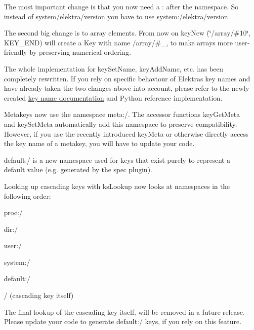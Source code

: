 \begin{DoxyItemize}
\item The most important change is that you now need a {\ttfamily \+:} after the namespace. So instead of {\ttfamily system/elektra/version} you have to use {\ttfamily system\+:/elektra/version}.
\item The second big change is to array elements. From now on {\ttfamily key\+New (\char`\"{}/array/\#10\char`\"{}, K\+E\+Y\+\_\+\+E\+ND)} will create a {\ttfamily Key} with name {\ttfamily /array/\#\+\_}, to make arrays more user-\/friendly by preserving numerical ordering.
\item The whole implementation for {\ttfamily key\+Set\+Name}, {\ttfamily key\+Add\+Name}, etc. has been completely rewritten. If you rely on specific behaviour of Elektra\textquotesingle{}s key names and have already taken the two changes above into account, please refer to the newly created \hyperlink{doc_KEYNAMES_md}{key name documentation} and Python reference implementation.
\item Metakeys now use the namespace {\ttfamily meta\+:/}. The accessor functions {\ttfamily key\+Get\+Meta} and {\ttfamily key\+Set\+Meta} automatically add this namespace to preserve compatibility. However, if you use the recently introduced {\ttfamily key\+Meta} or otherwise directly access the key name of a metakey, you will have to update your code.
\item {\ttfamily default\+:/} is a new namespace used for keys that exist purely to represent a default value (e.\+g. generated by the {\ttfamily spec} plugin).

Looking up cascading keys with {\ttfamily ks\+Lookup} now looks at namespaces in the following order\+:
\begin{DoxyItemize}
\item {\ttfamily proc\+:/}
\item {\ttfamily dir\+:/}
\item {\ttfamily user\+:/}
\item {\ttfamily system\+:/}
\item {\ttfamily default\+:/}
\item {\ttfamily /} (cascading key itself)
\end{DoxyItemize}

The final lookup of the cascading key itself, will be removed in a future release. Please update your code to generate {\ttfamily default\+:/} keys, if you rely on this feature.


\end{DoxyItemize}
